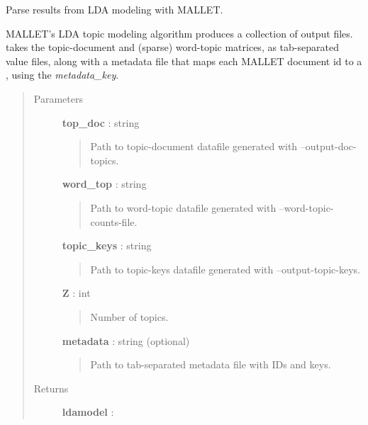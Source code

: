 \documentclass[letterpaper,10pt,english]{sphinxmanual}
\begin{document}
\begin{fulllineitems}
\label{tethne.readers:tethne.readers.mallet.load}
Parse results from LDA modeling with MALLET.

MALLET's LDA topic modeling algorithm produces a collection of output files.
{\hyperref[tethne.readers:tethne.readers.mallet.read]{}} takes the topic-document and (sparse) word-topic matrices, as
tab-separated value files, along with a metadata file that maps
each MALLET document id to a {\hyperref[tethne:tethne.data.Paper]{}}, using the \emph{metadata\_key}.
\begin{quote}\begin{description}
\item[{Parameters }] \leavevmode
\textbf{top\_doc} : string
\begin{quote}

Path to topic-document datafile generated with --output-doc-topics.
\end{quote}

\textbf{word\_top} : string
\begin{quote}

Path to word-topic datafile generated with --word-topic-counts-file.
\end{quote}

\textbf{topic\_keys} : string
\begin{quote}

Path to topic-keys datafile generated with --output-topic-keys.
\end{quote}

\textbf{Z} : int
\begin{quote}

Number of topics.
\end{quote}

\textbf{metadata} : string (optional)
\begin{quote}

Path to tab-separated metadata file with IDs and {\hyperref[tethne:tethne.data.Paper]{}} keys.
\end{quote}

\item[{Returns }] \leavevmode
\textbf{ldamodel} : {\hyperref[tethne:tethne.data.LDAModel]{}}

\end{description}\end{quote}

\end{fulllineitems}
\end{document}
